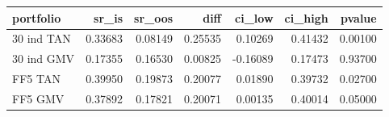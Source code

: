 \begin{tabular}{lrrrrrr}
\toprule
portfolio & sr\_is & sr\_oos & diff & ci\_low & ci\_high & pvalue \\
\midrule
30 ind TAN & 0.33683 & 0.08149 & 0.25535 & 0.10269 & 0.41432 & 0.00100 \\
30 ind GMV & 0.17355 & 0.16530 & 0.00825 & -0.16089 & 0.17473 & 0.93700 \\
FF5 TAN & 0.39950 & 0.19873 & 0.20077 & 0.01890 & 0.39732 & 0.02700 \\
FF5 GMV & 0.37892 & 0.17821 & 0.20071 & 0.00135 & 0.40014 & 0.05000 \\
\bottomrule
\end{tabular}
